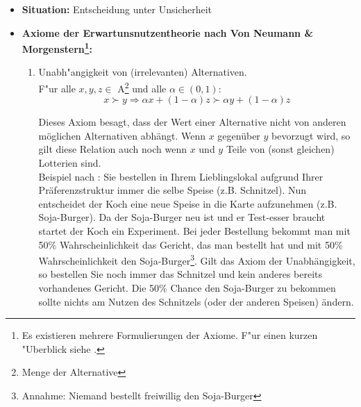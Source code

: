 \documentclass[11pt]{article}
\begin{document}
\begin{itemize}
\item \textbf{Situation:} Entscheidung unter Unsicherheit

\item \textbf{Axiome der Erwartunsnutzentheorie nach Von Neumann
    \& Morgenstern\footnote{Es existieren mehrere Formulierungen der Axiome. F"ur einen kurzen "Uberblick siehe \textcite[S. 689]{barbera2004handbook}.}:} \parencites[siehe][S. 689f.;]{barbera2004handbook}[S. 190ff.;]{rieck2012spieltheorie}[S. 24ff.]{von1955theory}
  
  \begin{enumerate}
  \item Unabh"angigkeit von (irrelevanten) Alternativen.\\
    F"ur alle $x, y, z \in$ A\footnote{Menge der Alternative} und alle $\alpha \in (0,1)$:\\
    \begin{equation}
      \label{eq:4}
      x \succ y \Rightarrow \alpha x +(1-\alpha) z \succ \alpha y + (1-\alpha) z  \tag{Unabh"angigkeit}
    \end{equation}

    Dieses Axiom besagt, dass der Wert einer Alternative nicht von anderen m\"oglichen Alternativen abh\"angt. Wenn $x$ gegen\"uber $y$ bevorzugt wird, so gilt diese Relation auch noch wenn $x$ und $y$ Teile von (sonst gleichen) Lotterien sind.\\
    Beispiel nach \textcite[S. 7]{osborne2004introduction}: Sie bestellen in Ihrem Lieblingslokal aufgrund Ihrer Pr\"aferenzstruktur immer die selbe Speise (z.B. Schnitzel). Nun entscheidet der Koch eine neue Speise in die Karte aufzunehmen (z.B. Soja-Burger). Da der Soja-Burger neu ist und er Test-esser braucht startet der Koch ein Experiment. Bei jeder Bestellung bekommt man mit 50\% Wahrscheinlichkeit das Gericht, das man bestellt hat und mit 50\% Wahrscheinlichkeit den Soja-Burger\footnote{Annahme: Niemand bestellt freiwillig den Soja-Burger}. Gilt das Axiom der Unabh\"angigkeit, so bestellen Sie noch immer das Schnitzel und kein anderes bereits vorhandenes Gericht. Die 50\% Chance den Soja-Burger zu bekommen sollte nichts am Nutzen des Schnitzels (oder der anderen Speisen) \"andern. 



\end{enumerate}
\end{itemize}
\end{document}
